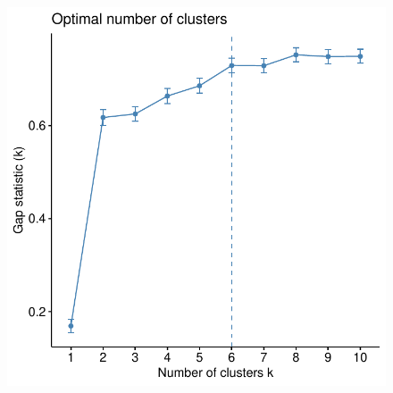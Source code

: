 \begin{outline}
\begin{figure}
    \centering
    \includegraphics[width=1.0\textwidth,page=1]{mainmatter/figures/chapter_04/plot_gene_set_enrichment.spline_fviz_nbclust_gap_stat.pdf}
    \caption{}
    \label{fig:multipants_dge_spline_fviz_nbclust_gap_stat}
\end{figure}


\end{outline}

